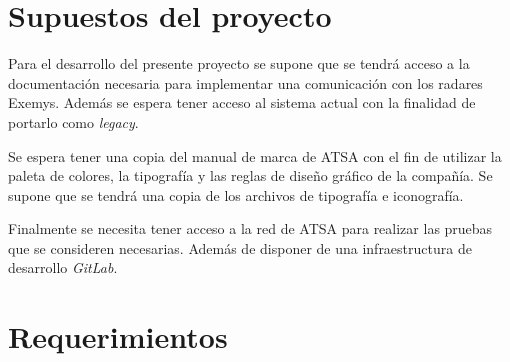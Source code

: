 \documentclass[
12pt,
spanish,
singlespacing,
parskip,
headsepline,]{article}
\begin{document}
\section{Supuestos del proyecto}

Para el desarrollo del presente proyecto se supone que se tendrá acceso a la documentación necesaria para implementar una comunicación con los radares Exemys.
Además se espera tener acceso al sistema actual con la finalidad de portarlo como \emph{legacy}.

Se espera tener una copia del manual de marca de ATSA con el fin de utilizar la paleta de colores, la tipografía y las reglas de diseño gráfico de la compañía. Se supone que se tendrá una copia de los archivos de tipografía e iconografía.

Finalmente se necesita tener acceso a la red de ATSA para realizar las pruebas que se consideren necesarias. Además de disponer de una infraestructura de desarrollo \emph{GitLab}.

\section{Requerimientos}
\end{document}

